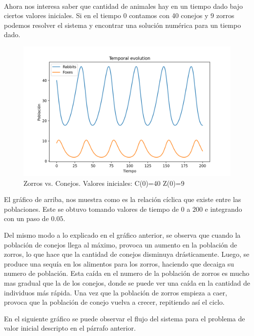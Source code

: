 \documentclass{article}
\begin{document}
\

Ahora nos interesa saber que cantidad de animales hay en un tiempo dado bajo ciertos valores iniciales. Si en el tiempo 0 contamos con 40 conejos y 9 zorros podemos resolver el sistema y encontrar una solución numérica para un tiempo dado.

\begin{figure}[H]
\centering
\includegraphics[width=\textwidth]{Figure_2.png}
\caption{Zorros vs. Conejos. Valores iniciales: C(0)=40 Z(0)=9}
\label{fig:Figure_2.png}
\end{figure}

El gráfico de arriba, nos muestra como es la relación cíclica que existe entre las poblaciones. Este se obtuvo tomando valores de tiempo de $0$ a $200$ e integrando con un paso de $0.05$.

Del mismo modo a lo explicado en el gráfico anterior, se observa que cuando la población de conejos llega al máximo, provoca un aumento en la población de zorros, lo que hace que la cantidad de conejos disminuya drásticamente. Luego, se produce una sequía en los alimentos para los zorros, haciendo que decaiga su numero de población. Esta caída en el numero de la población de zorros es mucho mas gradual que la de los conejos, donde se puede ver una caída en la cantidad de individuos más rápida. Una vez que la población de zorros empieza a caer, provoca que la población de conejo vuelva a crecer, repitiendo así el ciclo.
\


En el siguiente gráfico se puede observar el flujo del sistema para el problema de valor inicial descripto en el párrafo anterior.
\end{document}
